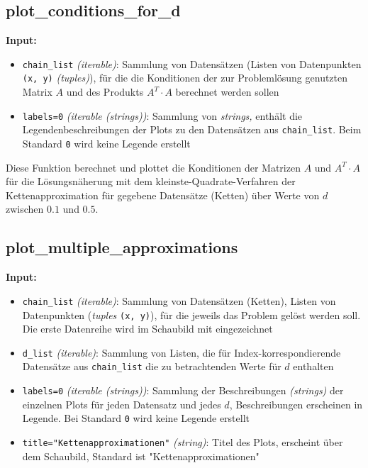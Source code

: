 \documentclass[a4paper, 11pt]{scrartcl}
\begin{document}
\subsection{plot\_conditions\_for\_d}

\textbf{Input:}
\begin{itemize}
    \item \texttt{chain\_list} \textit{(iterable)}:
    Sammlung von Datensätzen (Listen von Datenpunkten \texttt{(x, y)} \textit{(tuples)}), für die die
    Konditionen der zur Problemlösung genutzten Matrix $A$ und des Produkts $A^T \cdot A$ berechnet werden sollen
    \item \texttt{labels=0} \textit{(iterable (strings))}:
    Sammlung von \textit{strings,} enthält die Legendenbeschreibungen der Plots zu den Datensätzen aus \texttt{chain\_list}. Beim Standard \texttt{0} wird keine Legende erstellt 
\end{itemize}

\noindent Diese Funktion berechnet und plottet die Konditionen der Matrizen $A$ und $A^T \cdot A$ für die Lösungsnäherung mit dem kleinste-Quadrate-Verfahren der Kettenapproximation für gegebene Datensätze (Ketten) über Werte von $d$ zwischen $0.1$ und $0.5.$ 



\subsection{plot\_multiple\_approximations}

\textbf{Input:}
\begin{itemize}
    \item \texttt{chain\_list} \textit{(iterable)}:
        Sammlung von Datensätzen (Ketten), Listen von Datenpunkten (\textit{tuples} \texttt{(x, y)}), für die jeweils das Problem gelöst werden soll. Die erste Datenreihe wird im Schaubild mit eingezeichnet
    \item \texttt{d\_list} \textit{(iterable)}:
        Sammlung von Listen, die für Index-korrespondierende Datensätze aus \texttt{chain\_list} die zu betrachtenden Werte für $d$ enthalten
    \item \texttt{labels=0} \textit{(iterable (strings))}:
        Sammlung der Beschreibungen \textit{(strings)} der einzelnen Plots für jeden Datensatz und jedes $d$, Beschreibungen erscheinen in Legende.
        Bei Standard \texttt{0} wird keine Legende erstellt
    \item \texttt{title="Kettenapproximationen"} \textit{(string)}:
    Titel des Plots, erscheint über dem Schaubild, Standard ist "Kettenapproximationen" 
\end{itemize}
\end{document}
